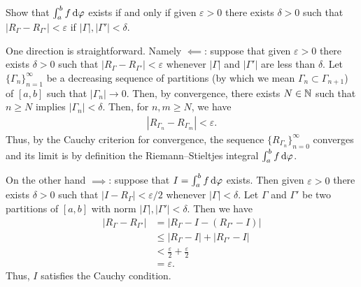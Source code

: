 \begin{problem}
  Show that $\int_a^bf\mathop{}\!\mathrm{d}\varphi$ exists if and only if given
  $\varepsilon>0$ there exists $\delta>0$ such that
  $\left|R_\Gamma-R_{\Gamma'}\right|<\varepsilon$ if
  $|\Gamma|,|\Gamma'|<\delta$.
\end{problem}
\begin{solution}
  One direction is straightforward. Namely $\impliedby$: suppose that given
  $\varepsilon>0$ there exists $\delta>0$ such that
  $|R_\Gamma-R_{\Gamma'}|<\varepsilon$ whenever $|\Gamma|$ and $|\Gamma'|$
  are less than $\delta$. Let ${\{\Gamma_n\}}_{n=1}^\infty$ be a decreasing
  sequence of partitions (by which we mean $\Gamma_n\subset\Gamma_{n+1}$)
  of $[a,b]$ such that $|\Gamma_n|\to 0$. Then, by convergence, there
  exists $N\in\mathbb{N}$ such that $n\geq N$ implies $|\Gamma_n|<\delta$. Then,
  for $n,m\geq N$, we have
  \begin{align*}
    |R_{\Gamma_n}-R_{\Gamma_m}|<\varepsilon.
  \end{align*}
  Thus, by the Cauchy criterion for convergence, the sequence
  ${\{R_{\Gamma_n}\}}_{n=0}^\infty$ converges and its limit is by
  definition the Riemann--Stieltjes integral $\int_a^b f\mathop{}\!\mathrm{d}\varphi$.

  On the other hand $\implies$: suppose that $I=\int_a^b f\mathop{}\!\mathrm{d}\varphi$
  exists. Then given $\varepsilon>0$ there exists $\delta>0$ such that
  $|I-R_\Gamma|<\varepsilon/2$ whenever $|\Gamma|<\delta$. Let $\Gamma$ and
  $\Gamma'$ be two partitions of $[a,b]$ with norm
  $|\Gamma|,|\Gamma'|<\delta$. Then we have
  \begin{align*}
    |R_\Gamma-R_{\Gamma'}|
    &=|R_\Gamma-I-(R_{\Gamma'}-I)|\\
    &\leq |R_\Gamma-I|+|R_{\Gamma'}-I|\\
    &<\frac{\varepsilon}{2}+\frac{\varepsilon}{2}\\
    &=\varepsilon.
  \end{align*}
  Thus, $I$ satisfies the Cauchy condition.
\end{solution}

